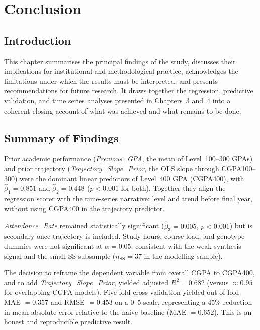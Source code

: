 \documentclass[12pt]{report}
\begin{document}
	\chapter{Conclusion}
	
	\section{Introduction}
	This chapter summarises the principal findings of the study, discusses their implications for institutional and methodological practice, acknowledges the limitations under which the results must be interpreted, and presents recommendations for future research. It draws together the regression, predictive validation, and time series analyses presented in Chapters~3 and~4 into a coherent closing account of what was achieved and what remains to be done.
	
	\section{Summary of Findings}
	Prior academic performance (\textit{Previous\_GPA}, the mean of Level~100--300 GPAs) and prior trajectory (\textit{Trajectory\_Slope\_Prior}, the OLS slope through CGPA100--300) were the dominant linear predictors of Level~400 GPA (CGPA400), with $\hat{\beta}_1 = 0.851$ and $\hat{\beta}_2 = 0.448$ ($p < 0.001$ for both). Together they align the regression scorer with the time-series narrative: level and trend before final year, without using CGPA400 in the trajectory predictor.
	
	\textit{Attendance\_Rate} remained statistically significant ($\hat{\beta}_3 = 0.005$, $p < 0.001$) but is secondary once trajectory is included. Study hours, course load, and genotype dummies were not significant at $\alpha = 0.05$, consistent with the weak synthesis signal and the small SS subsample ($n_{\text{SS}} = 37$ in the modelling sample).
	
	The decision to reframe the dependent variable from overall CGPA to CGPA400, and to add \textit{Trajectory\_Slope\_Prior}, yielded adjusted $R^2 = 0.682$ (versus $\approx 0.95$ for overlapping CGPA models). Five-fold cross-validation yielded out-of-fold MAE $= 0.357$ and RMSE $= 0.453$ on a 0--5 scale, representing a 45\% reduction in mean absolute error relative to the naive baseline (MAE $= 0.652$). This is an honest and reproducible predictive result.
	
\end{document}
